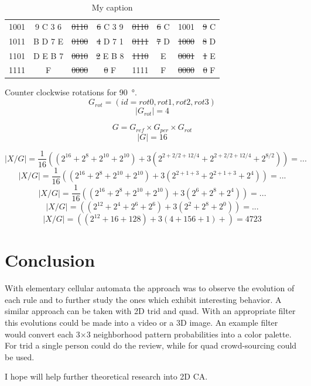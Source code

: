 \documentclass{ijuc}
\begin{document}
\begin{table}
\begin{center}
\begin{tabular}{cc|cc|cc|cc}
1001 & 9 C 3 6        & \sout{0110} & \sout{6} C 3 9 & \sout{0110} & \sout{6} C  &       1001  & \sout{9} C     \\
1011 & B D 7 E        & \sout{0100} & \sout{4} D 7 1 & \sout{0111} & \sout{7} D  & \sout{1000} & \sout{8} D     \\
1101 & D E B 7        & \sout{0010} & \sout{2} E B 8 & \sout{1110} &       E     & \sout{0001} & \sout{1} E     \\
1111 & F              & \sout{0000} & \sout{0} F     &       1111  &       F     & \sout{0000} & \sout{0} F     \\
\end{tabular}
\end{center}
\caption{My caption}
\label{tbl-quad}
\end{table}

Counter clockwise rotations for \SI{90}{\degree}.
\[ G_{rot} = (id=rot0, rot1, rot2, rot3) \]
\[ \vert G_{rot} \vert = 4 \]

\[ G = G_{ref} \times G_{per} \times G_{rot} \]
\[ \vert G \vert = 16 \]

\[ |X/G| = \frac{1}{16} \left( (2^{16} + 2^8 + 2^{10} + 2^{10}) + 3 (2^{2+2/2+12/4} + 2^{2+2/2+12/4} + 2^{8/2}) \right) = ... \]
\[ |X/G| = \frac{1}{16} \left( (2^{16} + 2^8 + 2^{10} + 2^{10}) + 3 (2^{2+1+3}      + 2^{2+1+3}      + 2^{4}  ) \right) = ... \]
\[ |X/G| = \frac{1}{16} \left( (2^{16} + 2^8 + 2^{10} + 2^{10}) + 3 (2^{6}          + 2^{8}          + 2^{4}  ) \right) = ... \]
\[ |X/G| =              \left( (2^{12} + 2^4 + 2^6 + 2^6) + 3 (2^2 + 2^8 + 2^0) \right) = ... \]
\[ |X/G| =              \left( (2^{12} + 16 + 128) + 3 (4 + 156 + 1) + \right) = 4723 \]

\section{Conclusion}

With elementary cellular automata the approach was to observe the evolution of
each rule and to further study the ones which exhibit interesting behavior.
A similar approach can be taken with 2D trid and quad. With an appropriate filter
this evolutions could be made into a video or a 3D image. An example filter would
convert each 3×3 neighborhood pattern probabilities into a color palette. For trid
a single person could do the review, while for quad crowd-sourcing could be used.

I hope will help further theoretical research into 2D CA.



\appendix 
\end{document}
